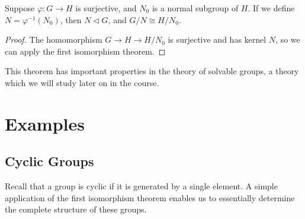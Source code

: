 \begin{comment}
\begin{theorem}
    If $H$ and $K$ are subgroups of a group $G$, then we define a $(H,K)$ coset to be a subset of $G$ of the form $HgK$, where $g \in G$. Then the set of $(H,K)$ cosets partitions the group, and if $G$ is the union of $Hg_1K, \dots, Hg_nK$,
    \[ |G| = \sum (H:H \cap g_nKg_n^{-1}) \]
    When $K$ is trivial, we obtain Lagrange's theorem.
\end{theorem}
\begin{proof}
    If $h_0g_0k_0 = h_1g_1k_1$, then $g_0 = h_0^{-1} h_1 g_1 k_1 k_0^{-1}$, and so
    \[ Hg_0K = Hh_0^{-1} h_1 g_1 k_1 k_0^{-1} K = H g_1 K \]
    so the $(H,K)$ cosets form a partition. If $Hg_1K, \dots, Hg_nK$ partition $G$, then
    \[ |G| = \sum |Hg_nK| \]
    The subgroup $H$ operates on the left on the set $G/K$, and $|Hg_nK|$ is the union of a particular orbit class of this action. One element of this orbit is $g_nK$, and $hg_nK = g_nK$ if and only if $h \in g_nK g_n^{-1} \cap H$, so the orbit stabilizer formula says
    \[ |Hg_nK| = (H: H \cap g_nKg_n^{-1}) \]
    This completes the proof.
\end{proof}
\end{comment}

\begin{theorem}
    Suppose $\varphi: G \to H$ is surjective, and $N_0$ is a normal subgroup of $H$. If we define $N = \varphi^{-1}(N_0)$, then $N \lhd G$, and $G/N \cong H/N_0$.
\end{theorem}
\begin{proof}
    The homomorphism $G \to H \to H/N_0$ is surjective and has kernel $N$, so we can apply the first isomorphism theorem.
\end{proof}

This theorem has important properties in the theory of solvable groups, a theory which we will study later on in the course.

\chapter{Examples}

\section{Cyclic Groups}

Recall that a group is cyclic if it is generated by a single element. A simple application of the first isomorphism theorem enables us to essentially determine the complete structure of these groups.

